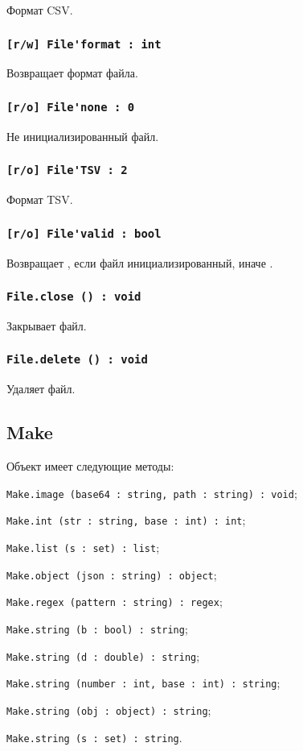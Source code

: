 Формат CSV.

\subsubsection{\lstinline|[r/w] File'format : int|}

Возвращает формат файла.

\subsubsection{\lstinline|[r/o] File'none : 0|}

Не инициализированный файл.

\subsubsection{\lstinline|[r/o] File'TSV : 2|}

Формат TSV.

\subsubsection{\lstinline|[r/o] File'valid : bool|}

Возвращает \true, если файл инициализированный, иначе \false.

\subsubsection{\lstinline|File.close () : void|}

Закрывает файл.

\subsubsection{\lstinline|File.delete () : void|}

Удаляет файл.

\subsection{{\color{orange} Make}}

Объект \make{} имеет следующие методы:
\begin{icItems}
	\item \lstinline|Make.image (base64 : string, path : string) : void|;
	\item \lstinline|Make.int (str : string, base : int) : int|;
	\item \lstinline|Make.list (s : set) : list|;
	\item \lstinline|Make.object (json : string) : object|;
	\item \lstinline|Make.regex (pattern : string) : regex|;
	\item \lstinline|Make.string (b : bool) : string|;
	\item \lstinline|Make.string (d : double) : string|;
	\item \lstinline|Make.string (number : int, base : int) : string|;
	\item \lstinline|Make.string (obj : object) : string|;
	\item \lstinline|Make.string (s : set) : string|.
\end{icItems}

